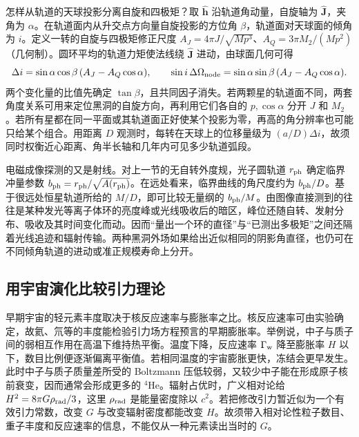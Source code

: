 怎样从轨道的天球投影分离自旋和四极矩？取 $\hat{\bm h}$ 沿轨道角动量，自旋轴为 $\hat{\bm J}$，夹角为 $\alpha$。在轨道面内从升交点方向量自旋投影的方位角 $\beta$，轨道面对天球面的倾角为 $i$。定义一转的自旋与四极矩修正尺度 $A_J=4\pi J/\sqrt{Mp^3}$、$A_Q=3\pi M_2/(Mp^2)$（几何制）。圆环平均的轨道力矩使法线绕 $\hat{\bm J}$ 进动，由球面几何可得
\[
 \Delta i=\sin\alpha\cos\beta\,(A_J-A_Q\cos\alpha),\qquad
 \sin i\,\Delta\Omega_{\rm node}
 =\sin\alpha\sin\beta\,(A_J-A_Q\cos\alpha).
\]
两个变化量的比值先确定 $\tan\beta$，且共同因子消失。若两颗星的轨道面不同，两套角度关系可用来定位黑洞的自旋方向，再利用它们各自的 $p,\cos\alpha$ 分开 $J$ 和 $M_2$。若所有星都在同一平面或其轨道面正好使某个投影为零，再高的角分辨率也可能只给某个组合。用距离 $D$ 观测时，每转在天球上的位移量级为 $(a/D)\Delta i$，故须同时权衡近心距离、角半长轴和几年内可见多少轨道弧段。

电磁成像探测的又是射线。对上一节的无自转外度规，光子圆轨道 $r_{\rm ph}$ 确定临界冲量参数 $b_{\rm ph}=r_{\rm ph}/\sqrt{A(r_{\rm ph})}$。在远处看来，临界曲线的角尺度约为 $b_{\rm ph}/D$。基于很远处恒星轨道所给的 $M/D$，即可比较无量纲的 $b_{\rm ph}/M$。由图像直接测到的往往是某种发光等离子体环的亮度峰或光线吸收后的暗区，峰位还随自转、发射分布、吸收及其时间变化而动。因而“量出一个环的直径”与“已测出多极矩”之间还隔着光线追迹和辐射传输。两种黑洞外场如果给出近似相同的阴影角直径，也仍可在不同倾角轨道的进动或准正规模寿命上分开。

\subsection{用宇宙演化比较引力理论}

早期宇宙的轻元素丰度取决于核反应速率与膨胀率之比。核反应速率可由实验确定，故氦、氘等的丰度能检验引力场方程预言的早期膨胀率。举例说，中子与质子间的弱相互作用在高温下维持热平衡。温度下降，反应速率 $\Gamma_{\rm w}$ 降至膨胀率 $H$ 以下，数目比例便逐渐偏离平衡值。若相同温度的宇宙膨胀更快，冻结会更早发生。此时中子与质子质量差所受的 Boltzmann 压低较弱，又较少中子能在形成原子核前衰变，因而通常会形成更多的 $^4\mathrm{He}$。辐射占优时，广义相对论给 $H^2=8\pi G\rho_{\rm rad}/3$，这里 $\rho_{\rm rad}$ 是能量密度除以 $c^2$。若把修改引力暂近似为一个有效引力常数，改变 $G$ 与改变辐射密度都能改变 $H$。故须带入相对论性粒子数目、重子丰度和反应速率的信息，不能仅从一种元素读出当时的 $G$。

